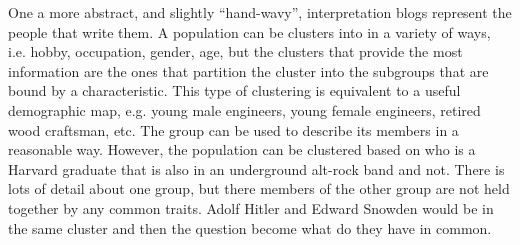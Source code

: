 One a more abstract, and slightly ``hand-wavy'', interpretation blogs represent the people that write them. A population can be clusters into in a variety of ways, i.e. hobby, occupation, gender, age, but the clusters that provide the most information are the ones that partition the cluster into the subgroups that are bound by a characteristic. This type of clustering is equivalent to a useful demographic map, e.g. young male engineers, young female engineers, retired wood craftsman, etc. The group can be used to describe its members in a reasonable way. However, the population can be clustered based on who is a Harvard graduate that is also in an underground alt-rock band and not.  There is lots of detail about one group, but there members of the other group are not held together by any common traits.  Adolf Hitler and Edward Snowden would be in the same cluster and then the question become what do they have in common. 
